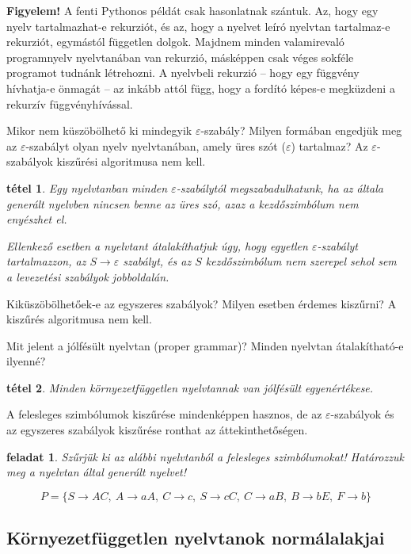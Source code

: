 \documentclass[a4paper]{article}
\newtheorem{feladat}{feladat}[section]
\newtheorem{tetel}{tétel}[section]
\begin{document}
\textbf{Figyelem!} A fenti Pythonos példát csak hasonlatnak szántuk. Az,
hogy egy nyelv tartalmazhat-e rekurziót, és az, hogy a nyelvet leíró
nyelvtan tartalmaz-e rekurziót, egymástól független dolgok. Majdnem
minden valamirevaló programnyelv nyelvtanában van rekurzió, másképpen
csak véges sokféle programot tudnánk létrehozni. A nyelvbeli rekurzió --
hogy egy függvény hívhatja-e önmagát -- az inkább attól függ, hogy a
fordító képes-e megküzdeni a rekurzív függvényhívással.

Mikor nem  küszöbölhető ki mindegyik $\varepsilon$-szabály?
Milyen formában engedjük meg az $\varepsilon$-szabályt olyan nyelv nyelvtanában,
amely üres szót ($\varepsilon$) tartalmaz?
Az $\varepsilon$-szabályok kiszűrési algoritmusa nem kell.

\begin{tetel}
Egy nyelvtanban minden $\varepsilon$-szabálytól megszabadulhatunk, ha az
általa generált nyelvben nincsen benne az üres szó, azaz a kezdőszimbólum
nem enyészhet el.

Ellenkező esetben a nyelvtant átalakíthatjuk úgy, hogy egyetlen
$\varepsilon$-szabályt tartalmazzon, az $S \rightarrow \varepsilon$ szabályt,
és az $S$ kezdőszimbólum nem szerepel sehol sem a levezetési szabályok
jobboldalán.
\end{tetel}

Kiküszöbölhetőek-e az egyszeres szabályok? Milyen esetben érdemes
kiszűrni? A kiszűrés algoritmusa nem kell.

Mit jelent a jólfésült nyelvtan (proper grammar)? Minden nyelvtan
átalakítható-e ilyenné?

\begin{tetel}
Minden környezetfüggetlen nyelvtannak van jólfésült egyenértékese.
\end{tetel}

A felesleges szimbólumok kiszűrése mindenképpen hasznos, de az
$\varepsilon$-szabályok és az egyszeres szabályok kiszűrése ronthat az
áttekinthetőségen.

\begin{feladat}
    Szűrjük ki az alábbi nyelvtanból a felesleges szimbólumokat!
    Határozzuk meg a nyelvtan által generált nyelvet!

\[P=\{ S \to AC,\: A\to aA ,\: C\to c,\: S\to cC,\: C\to aB,\: B\to
bE,\: F\to b\}\]
\end{feladat}

\subsection{Környezetfüggetlen nyelvtanok normálalakjai}
\end{document}
